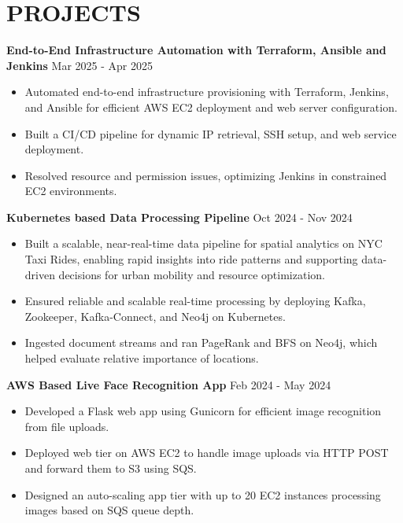 \documentclass[a4paper,9pt]{extarticle}
\begin{document}
\section*{PROJECTS}

\textbf{End-to-End Infrastructure Automation with Terraform, Ansible and Jenkins} \hfill Mar 2025 - Apr 2025%
\begin{itemize}
    \item Automated end-to-end infrastructure provisioning with Terraform, Jenkins, and Ansible for efficient AWS EC2 deployment and web server configuration.
    \item Built a CI/CD pipeline for dynamic IP retrieval, SSH setup, and web service deployment.
    \item Resolved resource and permission issues, optimizing Jenkins in constrained EC2 environments.
\end{itemize}

\noindent
\textbf{Kubernetes based Data Processing Pipeline}  \hfill Oct 2024 - Nov 2024%
\begin{itemize}
    \item Built a scalable, near-real-time data pipeline for spatial analytics on NYC Taxi Rides, enabling rapid insights into ride patterns and supporting data-driven decisions for urban mobility and resource optimization.
    \item Ensured reliable and scalable real-time processing by deploying Kafka, Zookeeper, Kafka-Connect, and Neo4j on Kubernetes.
    \item Ingested document streams and ran PageRank and BFS on Neo4j, which helped evaluate relative importance of locations.
    
\end{itemize}

\noindent
\textbf{AWS Based Live Face Recognition App}  \hfill Feb 2024 - May 2024 %
\begin{itemize}
    \item Developed a Flask web app using Gunicorn for efficient image recognition from file uploads.
    \item Deployed web tier on AWS EC2 to handle image uploads via HTTP POST and forward them to S3 using SQS.
    \item Designed an auto-scaling app tier with up to 20 EC2 instances processing images based on SQS queue depth.

    
\end{itemize}
\end{document}
